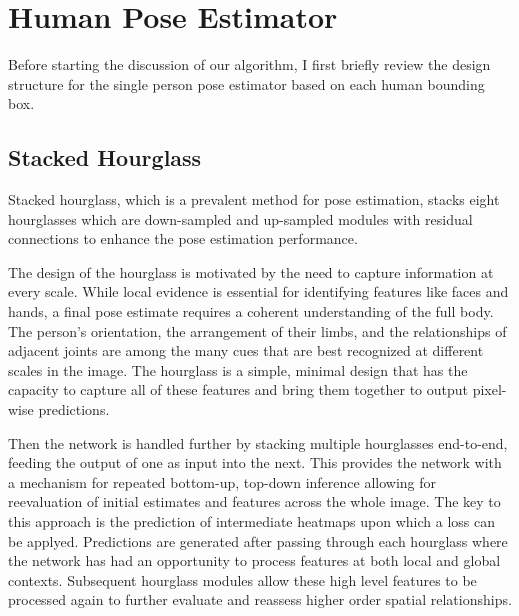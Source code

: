 \section{Human Pose Estimator}
Before starting the discussion of our algorithm, I first briefly review the design structure for the single person pose
estimator based on each human bounding box.
\subsection{Stacked Hourglass}
Stacked hourglass\cite{newell2016stacked}, which is a prevalent method for pose estimation,
stacks eight hourglasses which are down-sampled and up-sampled modules with residual connections to enhance the pose estimation performance.

The design of the hourglass is motivated by the need to capture information at every scale.
While local evidence is essential for identifying features like faces and hands, a final pose estimate requires a coherent understanding of the full body.
The person’s orientation, the arrangement of their limbs, and the relationships of adjacent joints are among the many cues that are best recognized at different scales in the image.
The hourglass is a simple, minimal design that has the capacity to capture all of these features and bring them together to output pixel-wise predictions.

Then the network is handled further by stacking multiple hourglasses end-to-end, feeding the output of one as input into the next.
This provides the network with a mechanism for repeated bottom-up, top-down inference allowing for reevaluation of initial estimates and features across the whole image.
The key to this approach is the prediction of intermediate heatmaps upon which a loss can be applyed.
Predictions are generated after passing through each hourglass where the network has had an opportunity to process features at both local and global contexts.
Subsequent hourglass modules allow these high level features to be processed again to further evaluate and reassess higher order spatial relationships.



